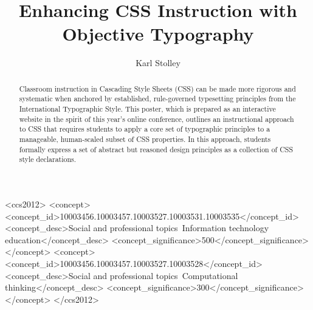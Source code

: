 \documentclass[sigconf]{acmart}
\begin{document}
\fancyhead{}

\title{Enhancing CSS Instruction with Objective Typography}

\author{Karl Stolley}


\begin{abstract}
	Classroom instruction in Cascading Style Sheets (CSS) can be made more rigorous and systematic when anchored by established, rule-governed typesetting principles from the International Typographic Style. This poster, which is prepared as an interactive website in the spirit of this year’s online conference, outlines an instructional approach to CSS that requires students to apply a core set of typographic principles to a manageable, human-scaled subset of CSS properties. In this approach, students  formally express a set of abstract but reasoned design principles as a collection of CSS style declarations.
\end{abstract}

\begin{CCSXML}
<ccs2012>
<concept>
<concept_id>10003456.10003457.10003527.10003531.10003535</concept_id>
<concept_desc>Social and professional topics~Information technology education</concept_desc>
<concept_significance>500</concept_significance>
</concept>
<concept>
<concept_id>10003456.10003457.10003527.10003528</concept_id>
<concept_desc>Social and professional topics~Computational thinking</concept_desc>
<concept_significance>300</concept_significance>
</concept>
</ccs2012>
\end{CCSXML}




\maketitle
\end{document}
